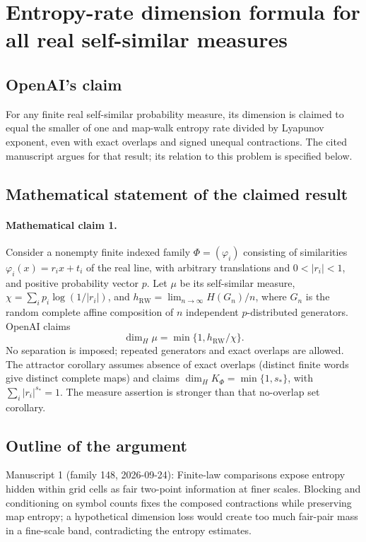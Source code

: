 \documentclass[11pt]{article}
\begin{document}
\section*{Entropy-rate dimension formula for all real self-similar measures}

\subsection{OpenAI's claim}
For any finite real self-similar probability measure, its dimension is claimed to equal the smaller of one and map-walk entropy rate divided by Lyapunov exponent, even with exact overlaps and signed unequal contractions. The cited manuscript argues for that result; its relation to this problem is specified below.

\subsection{Mathematical statement of the claimed result}
\paragraph{Mathematical claim 1.} Consider a nonempty finite indexed family $\Phi=(\varphi_i)$ consisting of similarities $\varphi_i(x)=r_ix+t_i$ of the real line, with arbitrary translations and $0<|r_i|<1$, and positive probability vector $p$. Let $\mu$ be its self-similar measure, $\chi=\sum_i p_i\log(1/|r_i|)$, and $h_{\mathrm{RW}}=\lim_{n\to\infty}H(G_n)/n$, where $G_n$ is the random complete affine composition of $n$ independent $p$-distributed generators. OpenAI claims
\[
\dim_H\mu=\min\{1,h_{\mathrm{RW}}/\chi\}.
\]
No separation is imposed; repeated generators and exact overlaps are allowed. The attractor corollary assumes absence of exact overlaps (distinct finite words give distinct complete maps) and claims $\dim_HK_\Phi=\min\{1,s_*\}$, with $\sum_i|r_i|^{s_*}=1$. The measure assertion is stronger than that no-overlap set corollary.

\subsection{Outline of the argument}
Manuscript 1 (family 148, 2026-09-24): Finite-law comparisons expose entropy hidden within grid cells as fair two-point information at finer scales. Blocking and conditioning on symbol counts fixes the composed contractions while preserving map entropy; a hypothetical dimension loss would create too much fair-pair mass in a fine-scale band, contradicting the entropy estimates.
\end{document}
